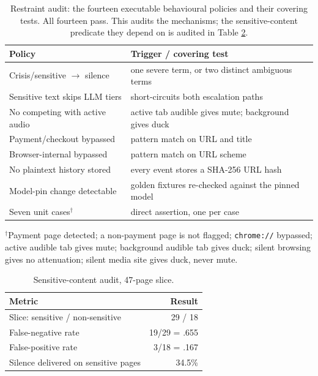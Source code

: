 \documentclass[conference]{IEEEtran}
\let\IEEEoriginalcaption\caption
\renewcommand{\caption}[1]{\IEEEoriginalcaption{\footnotesize #1}}
\begin{document}
\begin{table}[t]
\caption{Restraint audit: the fourteen executable behavioural policies
and their covering tests. All fourteen pass. This audits the
mechanisms; the sensitive-content predicate they depend on is audited
in Table \ref{tab:sensitive}.}
\label{tab:restraint}
\begin{center}
\scriptsize
\begin{tabular}{p{3.2cm}p{4.0cm}}
\toprule
\textbf{Policy} & \textbf{Trigger / covering test} \\
\midrule
Crisis/sensitive $\to$ silence & one severe term, or two distinct ambiguous terms \\
Sensitive text skips LLM tiers & short-circuits both escalation paths \\
No competing with active audio & active tab audible gives mute; background gives duck \\
Payment/checkout bypassed & pattern match on URL and title \\
Browser-internal bypassed & pattern match on URL scheme \\
No plaintext history stored & every event stores a SHA-256 URL hash \\
Model-pin change detectable & golden fixtures re-checked against the pinned model \\
Seven unit cases$^{\dagger}$ & direct assertion, one per case \\
\bottomrule
\end{tabular}
\end{center}
{\scriptsize $^{\dagger}$Payment page detected; a non-payment page is
not flagged; \texttt{chrome://} bypassed; active audible tab gives
mute; background audible tab gives duck; silent browsing gives no
attenuation; silent media site gives duck, never mute.}
\end{table}

\begin{table}[t]
\caption{Sensitive-content audit, 47-page slice.}
\label{tab:sensitive}
\begin{center}
\scriptsize
\begin{tabular}{lr}
\toprule
\textbf{Metric} & \textbf{Result} \\
\midrule
Slice: sensitive / non-sensitive & 29 / 18 \\
False-negative rate & 19/29 = .655 \\
False-positive rate & 3/18 = .167 \\
Silence delivered on sensitive pages & 34.5\% \\
\bottomrule
\end{tabular}
\end{center}
\end{table}
\end{document}
